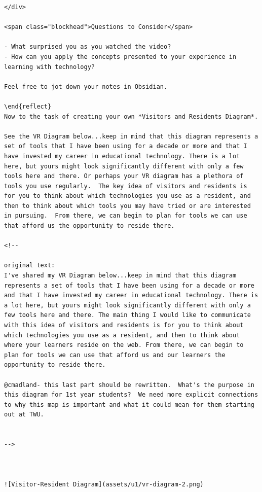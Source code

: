 \documentclass[
]{book}
\theoremstyle{definition}
\theoremstyle{definition}
\theoremstyle{definition}
\theoremstyle{definition}
\theoremstyle{remark}
\begin{document}
\begin{verbatim}
</div>

<span class="blockhead">Questions to Consider</span>

- What surprised you as you watched the video?
- How can you apply the concepts presented to your experience in learning with technology?

Feel free to jot down your notes in Obsidian.

\end{reflect}
Now to the task of creating your own *Visitors and Residents Diagram*.

See the VR Diagram below...keep in mind that this diagram represents a set of tools that I have been using for a decade or more and that I have invested my career in educational technology. There is a lot here, but yours might look significantly different with only a few tools here and there. Or perhaps your VR diagram has a plethora of tools you use regularly.  The key idea of visitors and residents is for you to think about which technologies you use as a resident, and then to think about which tools you may have tried or are interested in pursuing.  From there, we can begin to plan for tools we can use that afford us the opportunity to reside there.

<!--

original text:
I've shared my VR Diagram below...keep in mind that this diagram represents a set of tools that I have been using for a decade or more and that I have invested my career in educational technology. There is a lot here, but yours might look significantly different with only a few tools here and there. The main thing I would like to communicate with this idea of visitors and residents is for you to think about which technologies you use as a resident, and then to think about where your learners reside on the web. From there, we can begin to plan for tools we can use that afford us and our learners the opportunity to reside there.

@cmadland- this last part should be rewritten.  What's the purpose in this diagram for 1st year students?  We need more explicit connections to why this map is important and what it could mean for them starting out at TWU.


-->



![Visitor-Resident Diagram](assets/u1/vr-diagram-2.png)


\end{verbatim}
\end{document}
